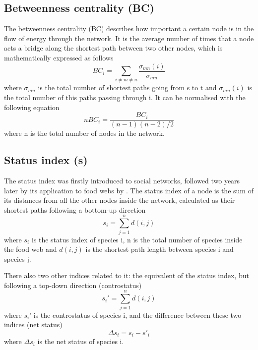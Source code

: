 \documentclass[twocolumn]{article}
\begin{document}
    \subsection*{Betweenness centrality (BC)}
        \indent The betweenness centrality (BC) describes how important a certain node is in the flow of energy through the network. It is the average number of times that a node acts a bridge along the shortest path between two other nodes, which is mathematically expressed as follows \citep{Wasserman1994} 
        \begin{equation}
            BC_i=\sum\limits_{i \neq m \neq n} \frac{\sigma_{mn}(i)}{\sigma_{mn}}
        \end{equation} where $\sigma_{mn}$ is the total number of shortest paths going from s to t and $\sigma_{mn}(i)$ is the total number of this paths passing through i. It can be normalised with the following equation \citep{Wasserman1994} 
        \begin{equation}
            nBC_i=\frac{BC_i}{(n-1)(n-2)/2}
        \end{equation} where n is the total number of nodes in the network.
    \subsection*{Status index (s)}
        The status index was firstly introduced to social networks, followed two years later by its application to food webs by \citet{Harary1959,Harary1961}. The status index of a node is the sum of its distances from all the other nodes inside the network, calculated as their shortest paths following a bottom-up direction \citep{Endredi2018}
        \begin{equation}
            s_i=\sum\limits^n_{j=1} d(i,j)
        \end{equation}
        where $s_i$ is the status index of species i, n is the total number of species inside the food web and $d(i,j)$ is the shortest path length between species i and species j. 
        \par There also two other indices related to it: the equivalent of the status index, but following a top-down direction (controstatus) 
         \begin{equation}
            s_i'=\sum\limits^n_{j=1} d(i,j)
        \end{equation}
        where $s_i$' is the controstatus of species i, and the difference between these two indices (net status)
        \begin{equation}
            \Delta s_i = s_i-s'_i    
        \end{equation}
        where $\Delta s_i$ is the net status of species i.
        
\end{document}
